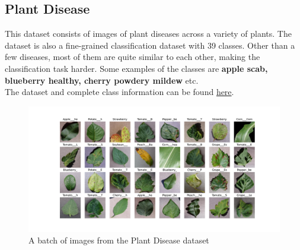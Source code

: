 \subsection{Plant Disease}
This dataset consists of images of plant diseases across a variety of plants. The dataset is also a fine-grained classification dataset with 39 classes. Other than a few diseases, most of them are quite similar to each other, making the classification task harder. Some examples of the classes are \textbf{apple scab, blueberry healthy, cherry powdery mildew} etc.\\
The dataset and complete class information can be found \href{https://www.kaggle.com/datasets/rajibdpi/plant-disease-dataset}{here}.
\begin{figure}[H]
    \centering
    \includegraphics[width=1\textwidth]{images/plantdisease.pdf}
    \caption{A batch of images from the Plant Disease dataset}
    \label{fig:plant}

\end{figure}

